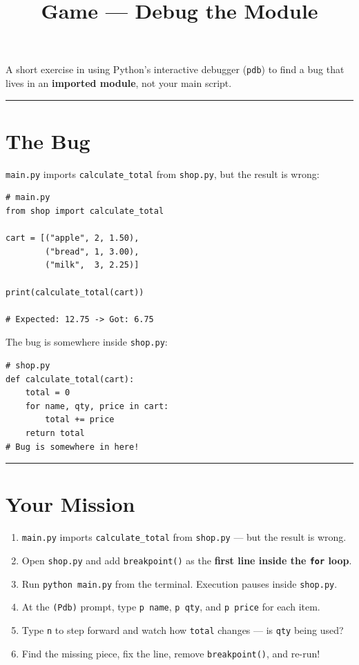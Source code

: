 \documentclass[11pt]{article}
\title{\textbf{Game --- Debug the Module}}
\author{}
\date{}
\newcommand{\horizrule}{\noindent\rule{\textwidth}{0.4pt}}
\begin{document}
\maketitle
\vspace{-2.5em}

\noindent A short exercise in using Python's interactive debugger (\texttt{pdb}) to find a bug that lives in an \textbf{imported module}, not your main script.

\vspace{0.5em}
\horizrule

\section*{The Bug}

\texttt{main.py} imports \texttt{calculate\_total} from \texttt{shop.py}, but the result is wrong:

\begin{lstlisting}
# main.py
from shop import calculate_total

cart = [("apple", 2, 1.50),
        ("bread", 1, 3.00),
        ("milk",  3, 2.25)]

print(calculate_total(cart))

# Expected: 12.75 -> Got: 6.75
\end{lstlisting}

The bug is somewhere inside \texttt{shop.py}:

\begin{lstlisting}
# shop.py
def calculate_total(cart):
    total = 0
    for name, qty, price in cart:
        total += price
    return total
# Bug is somewhere in here!
\end{lstlisting}

\horizrule

\section*{Your Mission}

\begin{enumerate}[leftmargin=*]
    \item \texttt{main.py} imports \texttt{calculate\_total} from \texttt{shop.py} --- but the result is wrong.
    \item Open \texttt{shop.py} and add \texttt{breakpoint()} as the \textbf{first line inside the \texttt{for} loop}.
    \item Run \texttt{python main.py} from the terminal. Execution pauses inside \texttt{shop.py}.
    \item At the \texttt{(Pdb)} prompt, type \texttt{p name}, \texttt{p qty}, and \texttt{p price} for each item.
    \item Type \texttt{n} to step forward and watch how \texttt{total} changes --- is \texttt{qty} being used?
    \item Find the missing piece, fix the line, remove \texttt{breakpoint()}, and re-run!
\end{enumerate}
\end{document}
